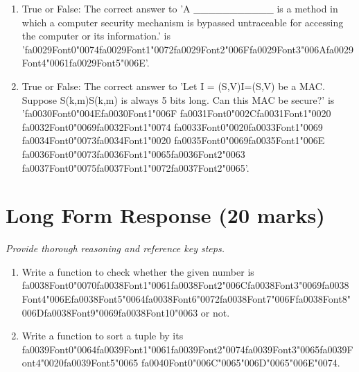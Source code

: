 \documentclass[12pt]{article}
\begin{document}
\begin{enumerate}[label=\arabic*.]
\item True or False: The correct answer to 'A \_\_\_\_\_\_\_\_\_\_\_ is a method in which a computer security mechanism is bypassed untraceable for accessing the computer or its information.' is '{\csname fa0029Font0\endcsname\char"0074}{\csname fa0029Font1\endcsname\char"0072}{\csname fa0029Font2\endcsname\char"006F}{\csname fa0029Font3\endcsname\char"006A}{\csname fa0029Font4\endcsname\char"0061}{\csname fa0029Font5\endcsname\char"006E}'.
\item True or False: The correct answer to 'Let I = (S,V)I=(S,V) be a MAC. Suppose S(k,m)S(k,m) is always 5 bits long. Can this MAC be secure?' is '{\csname fa0030Font0\endcsname\char"004E}{\csname fa0030Font1\endcsname\char"006F} {\csname fa0031Font0\endcsname\char"002C}{\csname fa0031Font1\endcsname\char"0020} {\csname fa0032Font0\endcsname\char"0069}{\csname fa0032Font1\endcsname\char"0074} {\csname fa0033Font0\endcsname\char"0020}{\csname fa0033Font1\endcsname\char"0069} {\csname fa0034Font0\endcsname\char"0073}{\csname fa0034Font1\endcsname\char"0020} {\csname fa0035Font0\endcsname\char"0069}{\csname fa0035Font1\endcsname\char"006E} {\csname fa0036Font0\endcsname\char"0073}{\csname fa0036Font1\endcsname\char"0065}{\csname fa0036Font2\endcsname\char"0063} {\csname fa0037Font0\endcsname\char"0075}{\csname fa0037Font1\endcsname\char"0072}{\csname fa0037Font2\endcsname\char"0065}'.
\end{enumerate}

\section*{Long Form Response (20 marks)}
\textit{Provide thorough reasoning and reference key steps.}
\begin{enumerate}[label=\arabic*.]
\item Write a function to check whether the given number is {\csname fa0038Font0\endcsname\char"0070}{\csname fa0038Font1\endcsname\char"0061}{\csname fa0038Font2\endcsname\char"006C}{\csname fa0038Font3\endcsname\char"0069}{\csname fa0038Font4\endcsname\char"006E}{\csname fa0038Font5\endcsname\char"0064}{\csname fa0038Font6\endcsname\char"0072}{\csname fa0038Font7\endcsname\char"006F}{\csname fa0038Font8\endcsname\char"006D}{\csname fa0038Font9\endcsname\char"0069}{\csname fa0038Font10\endcsname\char"0063} or not.
\item Write a function to sort a tuple by its {\csname fa0039Font0\endcsname\char"0064}{\csname fa0039Font1\endcsname\char"0061}{\csname fa0039Font2\endcsname\char"0074}{\csname fa0039Font3\endcsname\char"0065}{\csname fa0039Font4\endcsname\char"0020}{\csname fa0039Font5\endcsname\char"0065} {\csname fa0040Font0\endcsname\char"006C}{\char"0065}{\char"006D}{\char"0065}{\char"006E}{\char"0074}.
\end{enumerate}
\end{document}
